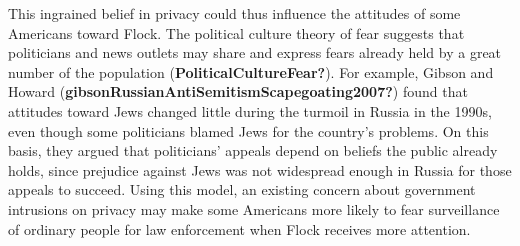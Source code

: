 \documentclass[
  american,
  12pt,
  letterpaper,
]{article}
\begin{document}
This ingrained belief in privacy could thus influence the attitudes of
some Americans toward Flock. The political culture theory of fear
suggests that politicians and news outlets may share and express fears
already held by a great number of the population
(\textbf{PoliticalCultureFear?}). For example, Gibson and Howard
(\textbf{gibsonRussianAntiSemitismScapegoating2007?}) found that
attitudes toward Jews changed little during the turmoil in Russia in the
1990s, even though some politicians blamed Jews for the country's
problems. On this basis, they argued that politicians' appeals depend on
beliefs the public already holds, since prejudice against Jews was not
widespread enough in Russia for those appeals to succeed. Using this
model, an existing concern about government intrusions on privacy may
make some Americans more likely to fear surveillance of ordinary people
for law enforcement when Flock receives more attention.

\newpage
\end{document}
